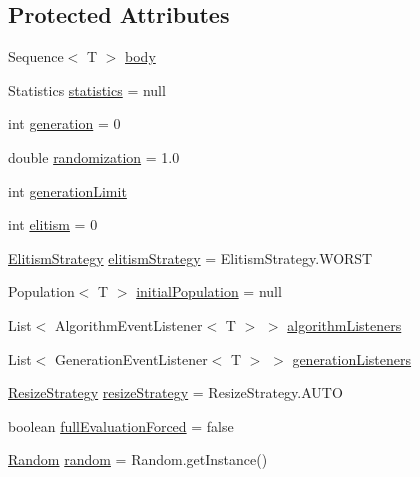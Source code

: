 \subsection*{Protected Attributes}
\begin{CompactItemize}
\item 
Sequence$<$ T $>$ \hyperlink{classjenes_1_1_genetic_algorithm_3_01_t_01extends_01_chromosome_01_4_0040f9dbb0018e8bb28dde97dacac7d8}{body}
\item 
Statistics \hyperlink{classjenes_1_1_genetic_algorithm_3_01_t_01extends_01_chromosome_01_4_fc23d5cbab5434f5ec5684cda9434b93}{statistics} = null
\item 
int \hyperlink{classjenes_1_1_genetic_algorithm_3_01_t_01extends_01_chromosome_01_4_c5a1ddc5e78e2b81c754eb990a91f17b}{generation} = 0
\item 
double \hyperlink{classjenes_1_1_genetic_algorithm_3_01_t_01extends_01_chromosome_01_4_dcb3e16398451c2e318de21d77b51d35}{randomization} = 1.0
\item 
int \hyperlink{classjenes_1_1_genetic_algorithm_3_01_t_01extends_01_chromosome_01_4_6677c80cf6ad470a0124fc2fa3051310}{generationLimit}
\item 
int \hyperlink{classjenes_1_1_genetic_algorithm_3_01_t_01extends_01_chromosome_01_4_c4280b01e7da0ddc049050b19e28b8b9}{elitism} = 0
\item 
\hyperlink{classjenes_1_1_genetic_algorithm_3_01_t_01extends_01_chromosome_01_4_afb755e144130d2c2c6ca86134dd871e}{ElitismStrategy} \hyperlink{classjenes_1_1_genetic_algorithm_3_01_t_01extends_01_chromosome_01_4_acba3e1823ba66a2dd6d3c902f8ff719}{elitismStrategy} = ElitismStrategy.WORST
\item 
Population$<$ T $>$ \hyperlink{classjenes_1_1_genetic_algorithm_3_01_t_01extends_01_chromosome_01_4_b6535da7a5097e18e6305d0f26f7cf5f}{initialPopulation} = null
\item 
List$<$ AlgorithmEventListener$<$ T $>$ $>$ \hyperlink{classjenes_1_1_genetic_algorithm_3_01_t_01extends_01_chromosome_01_4_53540867ddd13889614232b3cbea6d6f}{algorithmListeners}
\item 
List$<$ GenerationEventListener$<$ T $>$ $>$ \hyperlink{classjenes_1_1_genetic_algorithm_3_01_t_01extends_01_chromosome_01_4_265c4e10d321e68ae5757abf68d88739}{generationListeners}
\item 
\hyperlink{classjenes_1_1_genetic_algorithm_3_01_t_01extends_01_chromosome_01_4_49749d00b9417b958d1b30e08fc21d53}{ResizeStrategy} \hyperlink{classjenes_1_1_genetic_algorithm_3_01_t_01extends_01_chromosome_01_4_56f08a1d1f3355921b83f08745dbb3b3}{resizeStrategy} = ResizeStrategy.AUTO
\item 
boolean \hyperlink{classjenes_1_1_genetic_algorithm_3_01_t_01extends_01_chromosome_01_4_db627d0c6d6744f53ef5c3b7506913e9}{fullEvaluationForced} = false
\item 
\hyperlink{classjenes_1_1utils_1_1_random}{Random} \hyperlink{classjenes_1_1_genetic_algorithm_3_01_t_01extends_01_chromosome_01_4_1579283e210144ba90b937be0911a028}{random} = Random.getInstance()
\end{CompactItemize}
